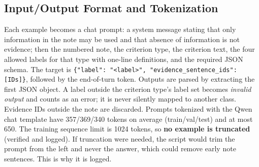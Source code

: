 \documentclass[conference]{IEEEtran}
\newcommand{\code}[1]{\texttt{\small #1}}
\begin{document}
\begin{table}[t]
\caption{Candidate open-weight decoders (public model cards; memory = weights only).}
\label{tab:models}
\centering\footnotesize
\setlength{\tabcolsep}{3pt}
\end{table}

\subsection{Input/Output Format and Tokenization}
Each example becomes a chat prompt: a system message stating that only information in the note may be used and that absence of information is not evidence; then the numbered note, the criterion type, the criterion text, the four allowed labels for that type with one-line definitions, and the required JSON schema. The target is
\code{\{"label": "<label>", "evidence\_sentence\_ids": [IDs]\}}, followed by the end-of-turn token. Outputs are parsed by extracting the first JSON object. A label outside the criterion type's label set becomes \emph{invalid output} and counts as an error; it is never silently mapped to another class. Evidence IDs outside the note are discarded.
Prompts tokenized with the Qwen chat template have 357/369/340 tokens on average (train/val/test) and at most 650. The training sequence limit is 1024 tokens, so \textbf{no example is truncated} (verified and logged). If truncation were needed, the script would trim the prompt from the left and never the answer, which could remove early note sentences. This is why it is logged.
\end{document}
